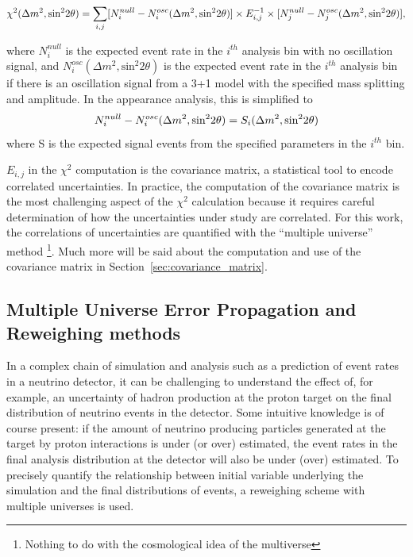 \begin{equation}
\begin{centering}
\label{eq:chi_sq}
\chi^2(\Delta m^2, \text{sin}^2 2 \theta ) = \sum_{i,j} [N^{null}_i - N^{osc}_i(\Delta m^2, \text{sin}^2 2 \theta ) ] \times E^{-1}_{i,j} \times [N^{null}_j - N^{osc}_j(\Delta m^2, \text{sin}^2 2 \theta ) ],
\end{centering}
\end{equation}

where $N^{null}_i$ is the expected event rate in the $i^{th}$ analysis bin with no oscillation signal, and $N^{osc}_i(\Delta m^2, \text{sin}^2 2 \theta )$ is the expected event rate in the $i^{th}$ analysis bin if there is an oscillation signal from a 3+1 model with the specified mass splitting and amplitude.  In the \nue appearance analysis, this is simplified to 
\begin{equation}
\begin{centering}
N^{null}_i - N^{osc}_i(\Delta m^2, \text{sin}^2 2 \theta ) = S_i(\Delta m^2, \text{sin}^2 2 \theta )
\end{centering}
\end{equation}
where S is the expected signal events from the specified parameters in the $i^{th}$ bin.

$E_{i,j}$ in the $\chi^2$ computation is the covariance matrix, a statistical tool to encode correlated uncertainties.  In practice, the computation of the covariance matrix is the most challenging aspect of the $\chi^2$ calculation because it requires careful determination of how the uncertainties under study are correlated.  For this work, the correlations of uncertainties are quantified with the ``multiple universe'' method \footnote{Nothing to do with the cosmological idea of the multiverse}.  Much more will be said about the computation and use of the covariance matrix in Section~\ref{sec:covariance_matrix}.

\subsection{Multiple Universe Error Propagation and Reweighing methods}

In a complex chain of simulation and analysis such as a prediction of event rates in a neutrino detector, it can be challenging to understand the effect of, for example, an uncertainty of hadron production at the proton target on the final distribution of neutrino events in the detector.  Some intuitive knowledge is of course present: if the amount of neutrino producing particles generated at the target by proton interactions is under (or over) estimated, the event rates in the final analysis distribution at the detector will also be under (over) estimated.  To precisely quantify the relationship between initial variable underlying the simulation and the final distributions of events, a reweighing scheme with multiple universes is used.

